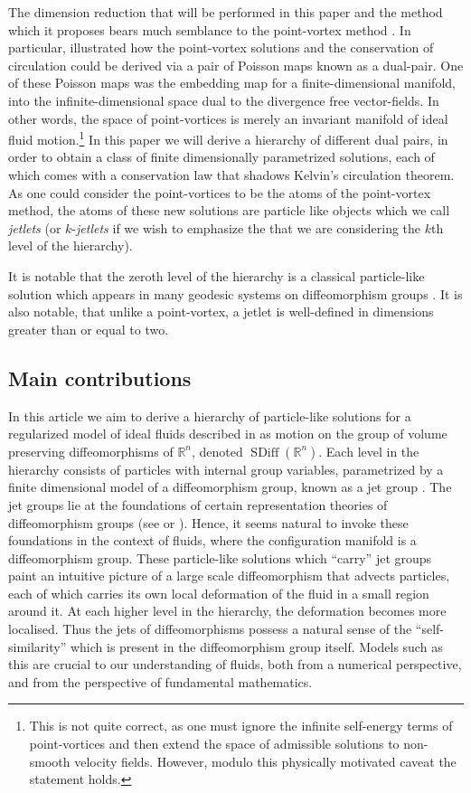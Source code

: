 \documentclass[12pt]{amsart}
\newcommand{\R}{\ensuremath{\mathbb{R}}}
\DeclareMathOperator{\SDiff}{SDiff}
\begin{document}
The dimension reduction that will be performed in this paper and the method which it proposes
bears much semblance to the point-vortex method \cite{Chorin1973}.
In particular, \cite{MarsdenWeinstein1983} illustrated how the point-vortex solutions and the conservation of circulation could be derived via a pair of Poisson maps known as a dual-pair.
One of these Poisson maps was the embedding map for a finite-dimensional manifold, into the infinite-dimensional space dual to the divergence free vector-fields.  In other words, the space of point-vortices is merely an invariant manifold of ideal fluid motion.\footnote{This is not quite correct, as one must ignore the infinite self-energy terms of point-vortices and then extend the space of admissible solutions to non-smooth velocity fields.  However, modulo this physically motivated caveat the statement holds.}
In this paper we will derive a hierarchy of different dual pairs, in order to obtain a class of finite dimensionally parametrized solutions,
each of which comes with a conservation law that shadows Kelvin's circulation theorem.
As one could consider the point-vortices to be the atoms of the point-vortex method,
the atoms of these new solutions are particle like objects which we call \emph{jetlets} (or $k$-\emph{jetlets} if we wish to emphasize the that we are considering the $k$th level of the hierarchy).

It is notable that the zeroth level of the hierarchy is a classical particle-like solution which appears in many geodesic
systems on diffeomorphism groups \cite{CamassaHolm1993,JoshiMiller2000,FringerHolm2001,MumfordMichor2013}.
It is also notable, that unlike a point-vortex, a jetlet is well-defined in dimensions greater than or equal to two.
\subsection{Main contributions}
In this article we aim to derive a hierarchy of particle-like
solutions for a regularized model of ideal fluids described in  \cite{MumfordMichor2013} as motion on the group of volume preserving
diffeomorphisms of $\R^n$, denoted $\SDiff(\R^n)$.
Each level in the hierarchy consists of particles
with internal group variables, parametrized by
a finite dimensional model of a diffeomorphism group,
known as a jet group \cite[Chapter 4]{KMS99}.
The jet groups lie at the foundations of certain representation theories of diffeomorphism groups (see \cite[Appendix 2]{VershikGelfandGraev1975} or \cite{Kirillov1981}).
Hence, it seems natural to invoke these foundations in the context of fluids, where the configuration manifold is a diffeomorphism group.
These particle-like solutions which ``carry'' jet groups paint an intuitive picture of a large scale diffeomorphism that advects particles,
each of which carries its own local deformation of the fluid in a small region around it.
At each higher level in the hierarchy, the deformation becomes more localised.
Thus the jets of diffeomorphisms possess a natural sense of the ``self-similarity'' which is present in the diffeomorphism group itself.
 Models such as this are crucial to our understanding of fluids,
  both from a numerical perspective, and from the perspective
  of fundamental mathematics.
\end{document}
